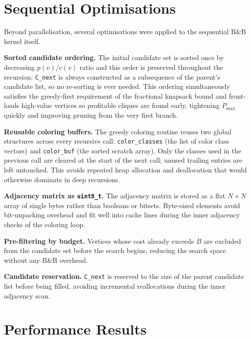 \documentclass[11pt,a4paper]{article}
\begin{document}
  \section{Sequential Optimisations}

  Beyond parallelisation, several optimisations were applied to the sequential
  B\&B kernel itself.

  \textbf{Sorted candidate ordering.}
  The initial candidate set is sorted once by decreasing $p(v)/c(v)$ ratio and
  this order is preserved throughout the recursion: \texttt{C\_next} is always
  constructed as a subsequence of the parent's candidate list, so no re-sorting
  is ever needed.  This ordering simultaneously satisfies the greedy-first
  requirement of the fractional knapsack bound and front-loads high-value
  vertices so profitable cliques are found early, tightening $P_{\max}$ quickly
  and improving pruning from the very first branch.

  \textbf{Reusable coloring buffers.}
  The greedy coloring routine reuses two global structures across every recursive
  call: \texttt{color\_classes} (the list of color class vectors) and
  \texttt{color\_buf} (the sorted scratch array).  Only the classes used in the
  previous call are cleared at the start of the next call; unused trailing
  entries are left untouched.  This avoids repeated heap allocation and
  deallocation that would otherwise dominate in deep recursions.

  \textbf{Adjacency matrix as \texttt{uint8\_t}.}
  The adjacency matrix is stored as a flat $N \times N$ array of single bytes
  rather than booleans or bitsets.  Byte-sized elements avoid bit-unpacking
  overhead and fit well into cache lines during the inner adjacency checks of
  the coloring loop.

  \textbf{Pre-filtering by budget.}
  Vertices whose cost already exceeds $B$ are excluded from the candidate set
  before the search begins, reducing the search space without any B\&B overhead.

  \textbf{Candidate reservation.}
  \texttt{C\_next} is reserved to the size of the parent candidate list before
  being filled, avoiding incremental reallocations during the inner adjacency
  scan.

  \section{Performance Results}
\end{document}
